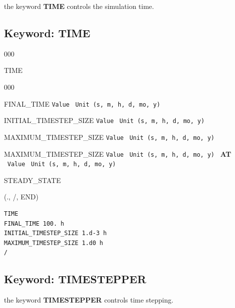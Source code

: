 \documentclass[12pt]{article}
\begin{document}

\newpage
\protect\hypertarget{target_time}{}

 the keyword {\bf TIME} controls the simulation time.

\subsection{Keyword: TIME}
\begin{deflist}{000}
\item[TIME] ~
\begin{deflist}{000}
\item[FINAL\_TIME] {\tt Value} \ {\tt Unit (s, m, h, d, mo, y)}
\item[INITIAL\_TIMESTEP\_SIZE] {\tt Value} \ {\tt Unit (s, m, h, d, mo, y)}
\item[MAXIMUM\_TIMESTEP\_SIZE] {\tt Value} \ {\tt Unit (s, m, h, d, mo, y)}
\item[MAXIMUM\_TIMESTEP\_SIZE] {\tt Value} \ {\tt Unit (s, m, h, d, mo, y)} \ {\bf AT} \ {\tt Value} \ {\tt Unit (s, m, h, d, mo, y)}
\item[STEADY\_STATE]
\end{deflist}
\item[(., /, END)]
\end{deflist}


\begin{verbatim}
TIME
FINAL_TIME 100. h
INITIAL_TIMESTEP_SIZE 1.d-3 h
MAXIMUM_TIMESTEP_SIZE 1.d0 h
/
\end{verbatim}

\newpage
\protect\hypertarget{target_timestep}{}

\subsection{Keyword: TIMESTEPPER}

 the keyword {\bf TIMESTEPPER} controls time stepping.
\end{document}
